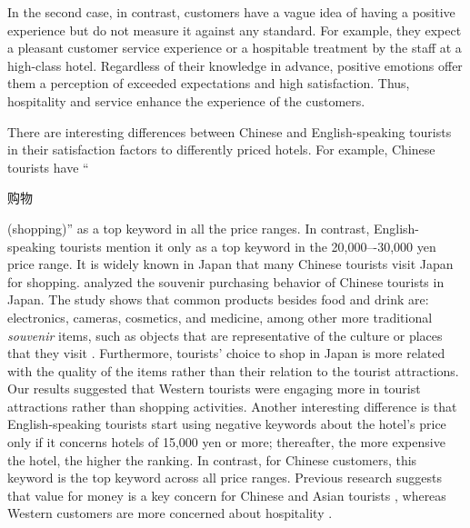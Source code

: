 \documentclass[smallextended,natbib]{svjour3}       %
\begin{document}
    In the second case, in contrast, customers have a vague idea of having a positive experience but do not measure it against any standard. For example, they expect a pleasant customer service experience or a hospitable treatment by the staff at a high-class hotel. Regardless of their knowledge in advance, positive emotions offer them a perception of exceeded expectations and high satisfaction. Thus, hospitality and service enhance the experience of the customers. 

    There are interesting differences between Chinese and English-speaking tourists in their satisfaction factors to differently priced hotels. For example, Chinese tourists have ``\begin{CJK}{UTF8}{gbsn}购物\end{CJK} (shopping)'' as a top keyword in all the price ranges. In contrast, English-speaking tourists mention it only as a top keyword in the 20,000–-30,000 yen price range. It is widely known in Japan that many Chinese tourists visit Japan for shopping. \cite{tsujimoto2017purchasing} analyzed the souvenir purchasing behavior of Chinese tourists in Japan. The study shows that common products besides food and drink are: electronics, cameras, cosmetics, and medicine, among other more traditional \textit{souvenir} items, such as objects that are representative of the culture or places that they visit \cite{japan2014consumption}. Furthermore, tourists’ choice to shop in Japan is more related with the quality of the items rather than their relation to the tourist attractions. Our results suggested that Western tourists were engaging more in tourist attractions rather than shopping activities. Another interesting difference is that English-speaking tourists start using negative keywords about the hotel's price only if it concerns hotels of 15,000 yen or more; thereafter, the more expensive the hotel, the higher the ranking. In contrast, for Chinese customers, this keyword is the top keyword across all price ranges. Previous research suggests that value for money is a key concern for Chinese and Asian tourists \cite[][]{choi2000,choi2001,truong2009}, whereas Western customers are more concerned about hospitality \cite[][]{kozak2002}.  
\end{document}

